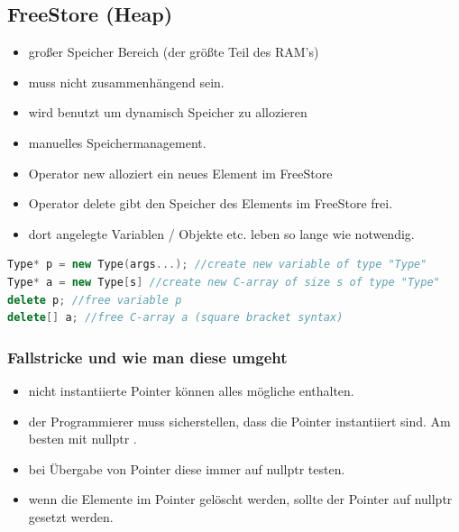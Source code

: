 \subsection{FreeStore (Heap)}
\begin{itemize}
	\item großer Speicher Bereich (der größte Teil des RAM's)
	\item muss nicht zusammenhängend sein. 
	\item wird benutzt um dynamisch Speicher zu allozieren
	\item manuelles Speichermanagement.
	\item Operator new alloziert ein neues Element im FreeStore 
	\item Operator delete gibt den Speicher des Elements im FreeStore frei.
	\item dort angelegte Variablen / Objekte etc. leben so lange wie notwendig.
\end{itemize}
\begin{lstlisting}[language=C++]
Type* p = new Type(args...); //create new variable of type "Type"
Type* a = new Type[s] //create new C-array of size s of type "Type"
delete p; //free variable p
delete[] a; //free C-array a (square bracket syntax)
\end{lstlisting}
\subsubsection{Fallstricke und wie man diese umgeht}
\begin{itemize}
	\item nicht instantiierte Pointer können alles mögliche enthalten.
	\item der Programmierer muss sicherstellen, dass die Pointer instantiiert sind. Am besten mit nullptr .
	\item bei Übergabe von Pointer diese immer auf nullptr testen.
	\item wenn die Elemente im Pointer gelöscht werden, sollte der Pointer auf nullptr gesetzt werden.
\end{itemize}
